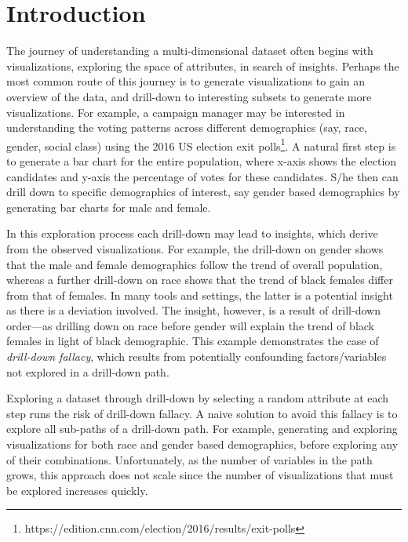 \section{Introduction}

The journey of understanding a multi-dimensional dataset often begins with visualizations, exploring the space of attributes, in search of insights. Perhaps the most common route of this journey is to generate visualizations to gain an overview of the data, and drill-down to interesting subsets to generate more visualizations. For example, a campaign manager may be interested in understanding the voting patterns across different demographics (say, race, gender, social class) using the 2016 US election exit polls\footnote{https://edition.cnn.com/election/2016/results/exit-polls}. A natural first step is to generate a bar chart for the entire population, where x-axis shows the election candidates and y-axis the percentage of votes for these candidates. S/he then can drill down to specific demographics of interest, say gender based demographics by generating bar charts for male and female. %

In this exploration process each drill-down may lead to insights, which derive from the observed visualizations. For example, the drill-down on gender shows that the male and female demographics follow the trend of overall population, whereas a further drill-down on race shows that the trend of black females differ from that of females. In many tools and settings, the latter is a potential insight as there is a deviation involved. The insight, however, is a result of drill-down order---as drilling down on race before gender will explain the trend of black females in light of black demographic. This example demonstrates the case of \emph{drill-down fallacy}, which results from potentially confounding factors/variables not explored in a drill-down path.

Exploring a dataset through drill-down by selecting a random attribute at each step runs the risk of drill-down fallacy. A naive solution to avoid this fallacy is to explore all sub-paths of a drill-down path. For example, generating and exploring visualizations for both race and gender based demographics, before exploring any of their combinations. Unfortunately, as the number of variables in the path grows, this approach does not scale since the number of visualizations that must be explored increases quickly. 

